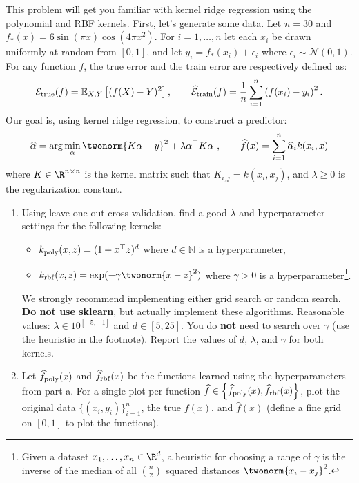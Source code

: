 \documentclass{article}
\begin{document}
\begin{aprob}
    This problem will get you familiar with kernel ridge regression using the polynomial and RBF kernels.
    First, let's generate some data. Let $n=30$ and $f_*(x) = 6 \sin(\pi x)\cos(4\pi x^2)$.
    For $i=1,\dots,n$ let each $x_i$ be drawn uniformly at random from $[0,1]$, and let $y_i = f_*(x_i) + \epsilon_i$ where $\epsilon_i \sim \mathcal{N}(0,1)$.
    For any function $f$, the true error and the train error are respectively defined as:
    $$\mathcal{E}_{\rm true}(f) = \mathbb{E}_{X,Y}\left[(f(X) - Y)^2\right], \quad \quad  \widehat{\mathcal{E}}_{\rm train}(f) =  \frac{1}{n} \sum_{i=1}^n \left(f(x_i)-y_i\right)^2.$$
    Our goal is, using kernel ridge regression, to construct a predictor:
    $$\widehat{\alpha} = \arg\min_\alpha \twonorm{K\alpha - y}^2 + \lambda \alpha^\top K \alpha \ , \quad \quad \widehat{f}(x) = \sum_{i=1}^n \widehat{\alpha}_i k(x_i,x)$$
    where $K\in\R^{n\times n}$ is the kernel matrix such that $K_{i,j} = k(x_i,x_j)$, and $\lambda\geq 0$ is the regularization constant.

    \begin{enumerate}
        \item {} Using leave-one-out cross validation, find a good $\lambda$ and hyperparameter settings for the following kernels:
        \begin{itemize}
            \item $k_{\rm poly}(x,z) = (1+x^\top z)^d$ where $d \in \mathbb{N}$ is a hyperparameter,
            \item $k_{\rm rbf}(x,z) = \exp(-\gamma \twonorm{x-z}^2)$ where $\gamma > 0$ is a hyperparameter\footnote{Given a dataset $x_1,\dots,x_n \in \R^d$, a heuristic for choosing a range of $\gamma$ is the inverse of the median of all $\binom{n}{2}$ squared distances $\twonorm{x_i-x_j}^2$.}.
        \end{itemize}
        We strongly recommend implementing either \href{https://en.wikipedia.org/wiki/Hyperparameter_optimization#Grid_search}{grid search} or \href{https://en.wikipedia.org/wiki/Hyperparameter_optimization#Random_search}{random search}. \textbf{Do not use sklearn}, but actually implement these algorithms. Reasonable values: $\lambda \in 10^{[-5, -1]}$ and $d \in [5, 25]$. You do \textbf{not} need to search over $\gamma$ (use the heuristic in the footnote).
        Report the values of $d$, $\lambda$, and $\gamma$ for both kernels.
        \item {} Let $\widehat{f}_{\rm poly}(x)$ and $\widehat{f}_{\rm rbf}(x)$ be the functions learned using the hyperparameters from part a.
        For a single plot per function $\widehat{f} \in \left\lbrace \widehat{f}_{\rm poly}(x), \widehat{f}_{\rm rbf}(x) \right\rbrace$, plot the original data $\{(x_i,y_i)\}_{i=1}^n$, the true $f(x)$, and $\widehat{f}(x)$ (define a fine grid on $[0,1]$ to plot the functions).
    \end{enumerate}

\end{aprob}
\end{document}
